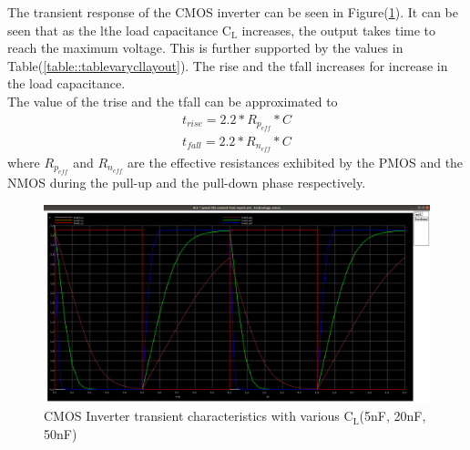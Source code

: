 \documentclass[12pt, a4paper]{article}
\begin{document}
	The transient response of the CMOS inverter can be seen in Figure(\ref{fig::layout_tran}). It can be seen that as the lthe load capacitance $\text{C}_\text{L}$ increases, the output takes time to reach the maximum voltage. This is further supported by the values in Table(\ref{table::tablevarycllayout}). The rise and the tfall increases for increase in the load capacitance.\\
	
	The value of the trise and the tfall can be approximated to 
	\begin{align}
	t_{rise} = 2.2*R_{p_{eff}}*C \\ 
	t_{fall} = 2.2*R_{n_{eff}}*C 
	\end{align}
	where $R_{p_{eff}}$ and $R_{n_{eff}}$ are the effective resistances exhibited by the PMOS and the NMOS during the pull-up and the pull-down phase respectively. 
	\begin{figure}[H]
		\begin{center}
			\includegraphics[scale = 0.2]{images/layout_tran_cl.png}
			\caption{CMOS Inverter transient characteristics with various $\text{C}_\text{L}$(5nF, 20nF, 50nF)}
			\label{fig::layout_tran}
		\end{center}
	\end{figure}
\end{document}
